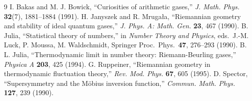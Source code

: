 \documentclass[a4paper,11pt]{article}
\theoremstyle{plain}
\theoremstyle{definition}
\theoremstyle{remark}
\begin{document}
\begin{thebibliography}{9}
I. Bakas and M. J. Bowick, ``Curiosities of arithmetic gases,'' \textit{J. Math. Phys.} \textbf{32}(7),
1881--1884 (1991).
H. Janyszek and R. Mruga\l{}a, ``Riemannian geometry and stability of ideal quantum gases,''
\textit{J. Phys. A: Math. Gen.} \textbf{23}, 467 (1990).
B. Julia, ``Statistical theory of numbers,'' in \textit{Number Theory and Physics}, eds.\ J.-M. Luck,
P. Moussa, M. Waldschmidt, Springer Proc.\ Phys.\ \textbf{47}, 276--293 (1990).
B. L. Julia, ``Thermodynamic limit in number theory: Riemann-Beurling gases,'' \textit{Physica A}
\textbf{203}, 425 (1994).
G. Ruppeiner, ``Riemannian geometry in thermodynamic fluctuation theory,'' \textit{Rev. Mod. Phys.}
\textbf{67}, 605 (1995).
D. Spector, ``Supersymmetry and the M\"obius inversion function,'' \textit{Commun. Math. Phys.}
\textbf{127}, 239 (1990).
\end{thebibliography}
\end{document}
